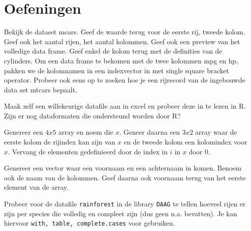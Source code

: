 

\pagebreak
\section{Oefeningen}
\begin{exercise}
Bekijk de dataset mcars. Geef de waarde terug voor de eerste rij, tweede kolom. Geef ook het aantal rijen, het aantal kolommen. Geef ook een preview van het volledige data frame. Geef enkel de kolom terug met de definities van de cylinders. Om een data frame te bekomen met de twee kolommen mpg en hp, pakken we de kolomnamen in een indexvector in met single square bracket operator. Probeer ook eens op te zoeken hoe je een rijrecord van de ingebouwde data set mtcars bepaalt.
\end{exercise}

\begin{exercise}
Maak zelf een willekeurige datafile aan in excel en probeer deze in te lezen in R. Zijn er nog dataformaten die ondersteund worden door R?
\end{exercise}



\begin{exercise}
	Genereer een $4x5$ array en noem die $x$. Geneer daarna een $3x2$ array waar de eerste kolom de rijindex kan zijn van $x$ en de tweede kolom een kolomindex voor $x$. Vervang de elementen gedefinieerd door de index in $i$ in $x$ door 0. 
\end{exercise}

\begin{exercise}
	Genereer een vector waar een voornaam en een achternaam in komen. Benoem ook de naam van de kolommen. Geef daarna ook voornaam terug van het eerste element van de array. 
\end{exercise}

\begin{exercise}
	Probeer voor de datafile \texttt{rainforest} in de library \texttt{DAAG} te tellen hoeveel rijen er zijn per species die volledig en compleet zijn (dus geen n.a. bevatten). Je kan hiervoor \texttt{with, table, complete.cases} voor gebruiken. 
\end{exercise}